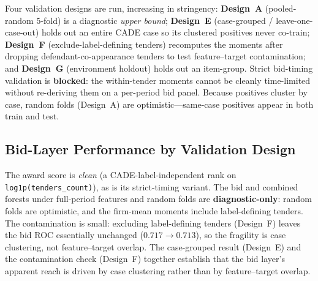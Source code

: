 Four validation designs are run, increasing in stringency:
\textbf{Design~A} (pooled-random $5$-fold) is a diagnostic
\emph{upper bound}; \textbf{Design~E} (case-grouped / leave-one-case-out)
holds out an entire CADE case so its clustered positives never co-train;
\textbf{Design~F} (exclude-label-defining tenders) recomputes the moments
after dropping defendant-co-appearance tenders to test feature--target
contamination; and \textbf{Design~G} (environment holdout) holds out an
item-group. Strict bid-timing validation is \textbf{blocked}: the
within-tender moments cannot be cleanly time-limited without re-deriving
them on a per-period bid panel. Because positives cluster by case, random
folds (Design~A) are optimistic---same-case positives appear in both
train and test.

\subsection{Bid-Layer Performance by Validation Design}
\label{supp:bid_perf}

The award score is \emph{clean} (a CADE-label-independent rank on
\texttt{log1p(tenders\_count)}), as is its strict-timing variant. The bid
and combined forests under full-period features and random folds are
\textbf{diagnostic-only}: random folds are optimistic, and the firm-mean
moments include label-defining tenders. The contamination is small:
excluding label-defining tenders (Design~F) leaves the bid ROC essentially
unchanged ($0.717 \to 0.713$), so the fragility is case clustering, not
feature--target overlap. The case-grouped result (Design~E) and the
contamination check (Design~F) together establish that the bid layer's
apparent reach is driven by case clustering rather than by feature--target
overlap.

